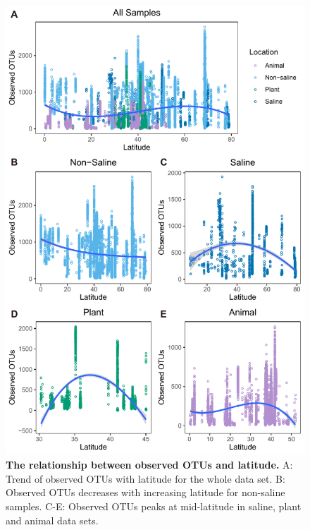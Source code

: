 \begin{figure}[H]
    \centering
    \includegraphics[scale=0.9]{./Figures/OO_lati_empo2}
    \caption{\textbf{The relationship between observed OTUs and latitude.} A: Trend of observed OTUs with latitude for the whole data set. B: Observed OTUs decreases with increasing latitude for non-saline samples. C-E: Observed OTUs peaks at mid-latitude in saline, plant and animal data sets.}
    \label{fig:OO_lati}
\end{figure}

